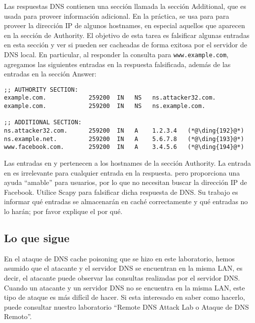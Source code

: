 Las respuestas DNS contienen una sección llamada la sección Additional, que es usada para proveer información adicional. En la práctica, se usa para para proveer la dirección IP de algunos hostnames, en especial aquellos que aparecen en la sección de Authority. El objetivo de esta tarea es falsificar algunas entradas en esta sección y ver si pueden ser cacheadas de forma exitosa por el servidor de DNS local. En particular, al responder la consulta para \texttt{www.example.com}, agregamos las siguientes entradas en la respuesta falsificada, además de las entradas en la sección Answer:

\begin{lstlisting}
;; AUTHORITY SECTION:
example.com.            259200  IN   NS   ns.attacker32.com.
example.com.            259200  IN   NS   ns.example.com.

;; ADDITIONAL SECTION:
ns.attacker32.com.      259200  IN   A    1.2.3.4   (*@\ding{192}@*)
ns.example.net.         259200  IN   A    5.6.7.8   (*@\ding{193}@*)
www.facebook.com.       259200  IN   A    3.4.5.6   (*@\ding{194}@*)
\end{lstlisting}

Las entradas en   y  pertenecen a los hostnames de la sección Authority. La entrada en  es irrelevante para cualquier entrada en la respuesta. pero proporciona una ayuda ``amable'' para usuarios, por lo que no necesitan buscar la dirección IP de Facebook. Utilice Scapy para falsificar dicha respuesta de DNS. Su trabajo es informar qué entradas se almacenarán en caché correctamente y qué entradas no lo harán; por favor explique el por qué.


\subsection{Lo que sigue}

En el ataque de DNS cache poisoning que se hizo en este laboratorio, hemos asumido que el atacante y el servidor DNS se encuentran en la misma LAN, es decir, el atacante puede observar las consultas realizadas por el servidor DNS.
Cuando un atacante y un servidor DNS no se encuentra en la misma LAN, este tipo de ataque es más difícil de hacer. Si esta interesado en saber como hacerlo, puede consultar nuestro laboratorio ``Remote DNS Attack Lab o Ataque de DNS Remoto''.


